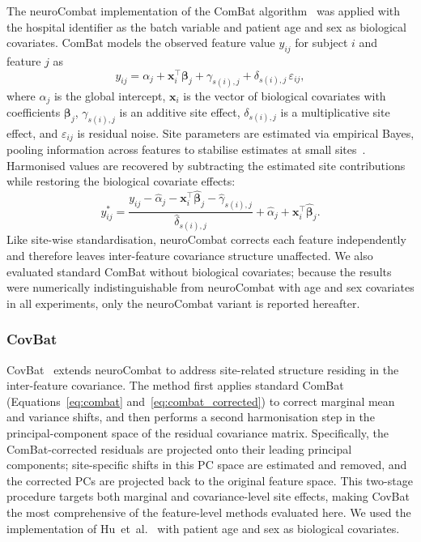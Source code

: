 \documentclass[preprint,12pt]{elsarticle}
\begin{document}
The neuroCombat implementation of the ComBat
algorithm~\cite{johnson2007adjusting,fortin2017harmonization} was
applied with the hospital identifier as the batch variable and patient
age and sex as biological covariates.
ComBat models the observed feature value $y_{ij}$ for subject $i$ and
feature $j$ as
\begin{equation}
  y_{ij} = \alpha_j + \mathbf{x}_i^{\top}\boldsymbol{\beta}_j
           + \gamma_{s(i),j} + \delta_{s(i),j}\,\varepsilon_{ij},
  \label{eq:combat}
\end{equation}
where $\alpha_j$ is the global intercept, $\mathbf{x}_i$ is the
vector of biological covariates with coefficients
$\boldsymbol{\beta}_j$, $\gamma_{s(i),j}$ is an additive site
effect, $\delta_{s(i),j}$ is a multiplicative site effect, and
$\varepsilon_{ij}$ is residual noise.
Site parameters are estimated via empirical Bayes, pooling information
across features to stabilise estimates at small
sites~\cite{johnson2007adjusting}.
Harmonised values are recovered by subtracting the estimated site
contributions while restoring the biological covariate effects:
\begin{equation}
  y^*_{ij} = \frac{y_{ij} - \hat{\alpha}_j
             - \mathbf{x}_i^{\top}\hat{\boldsymbol{\beta}}_j
             - \hat{\gamma}_{s(i),j}}{\hat{\delta}_{s(i),j}}
             + \hat{\alpha}_j
             + \mathbf{x}_i^{\top}\hat{\boldsymbol{\beta}}_j.
  \label{eq:combat_corrected}
\end{equation}
Like site-wise standardisation, neuroCombat corrects each feature
independently and therefore leaves inter-feature covariance structure
unaffected.
We also evaluated standard ComBat without biological covariates;
because the results were numerically indistinguishable from
neuroCombat with age and sex covariates in all experiments, only the
neuroCombat variant is reported hereafter.

\subsubsection{CovBat}
\label{subsubsec:covbat}

CovBat~\cite{hu2023image} extends neuroCombat to address site-related
structure residing in the inter-feature covariance.
The method first applies standard ComBat (Equations~\ref{eq:combat}
and~\ref{eq:combat_corrected}) to correct marginal mean and variance
shifts, and then performs a second harmonisation step in the
principal-component space of the residual covariance matrix.
Specifically, the ComBat-corrected residuals are projected onto their
leading principal components; site-specific shifts in this PC space
are estimated and removed, and the corrected PCs are projected back
to the original feature space.
This two-stage procedure targets both marginal and covariance-level
site effects, making CovBat the most comprehensive of the
feature-level methods evaluated here.
We used the implementation of Hu~et~al.~\cite{hu2023image} with
patient age and sex as biological covariates.
\end{document}
